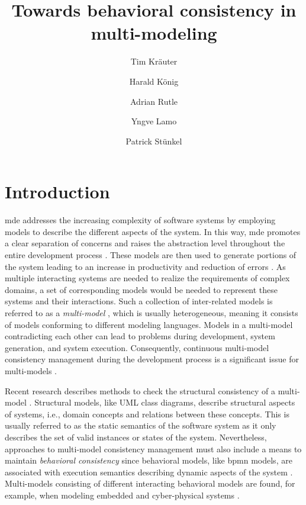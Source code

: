 \documentclass{jot}
\title{Towards behavioral consistency in multi-modeling}
\author[$\ast$]{Tim Kräuter}
\author[$\ast\dagger$]{Harald König}
\author[$\ast$]{Adrian Rutle}
\author[$\ast$]{Yngve Lamo}
\author[$\ddagger$]{Patrick Stünkel}
\affil[$\ast$]{Western Norway University of Applied Sciences, Bergen, Norway}
\affil[$\dagger$]{University of Applied Sciences, FHDW, Hannover, Germany}
\affil[$\ddagger$]{Haukeland Universitetssykehus, Bergen, Norway}
\begin{document}
    
\maketitle
{}


\section{Introduction} \label{sec:introduction}
\gls*{mde} addresses the increasing complexity of software systems by employing models to describe the different aspects of the system.
In this way, \gls*{mde} promotes a clear separation of concerns and raises the abstraction level throughout the entire development process \cite{franceModeldrivenDevelopmentComplex2007}.
These models are then used to generate portions of the system leading to an increase in productivity and reduction of errors \cite{brambillaModeldrivenSoftwareEngineering2017}.
As multiple interacting systems are needed to realize the requirements of complex domains, a set of corresponding models would be needed to represent these systems and their interactions.
Such a collection of inter-related models is referred to as a \emph{multi-model} \cite{stunkelComprehensiveSystemsFormal2021}, which is usually heterogeneous, meaning it consists of models conforming to different modeling languages.
Models in a multi-model contradicting each other can lead to problems during development, system generation, and system execution.
Consequently, continuous multi-model consistency management during the development process is a significant issue for multi-models \cite{spanoudakisInconsistencyManagementSoftware2001, cicchettiMultiviewApproachesSoftware2019}.

Recent research describes methods to check the structural consistency of a multi-model \cite{stunkelComprehensiveSystemsFormal2021, klareCommonalitiesPreservingConsistency2019}.
Structural models, like UML class diagrams, describe structural aspects of systems, i.e., domain concepts and relations between these concepts.
This is usually referred to as the static semantics of the software system as it only describes the set of valid instances or states of the system.
Nevertheless, approaches to multi-model consistency management must also include a means to maintain \emph{behavioral consistency} since behavioral models, like \gls*{bpmn} models, are associated with execution semantics describing dynamic aspects of the system \cite{objectmanagementgroupUnifiedModelingLanguage2017, objectmanagementgroupBusinessProcessModel2013}.
Multi-models consisting of different interacting behavioral models are found, for example, when modeling embedded and cyber-physical systems \cite{varalarsenBehavioralCoordinationOperator2015}.
\end{document}
